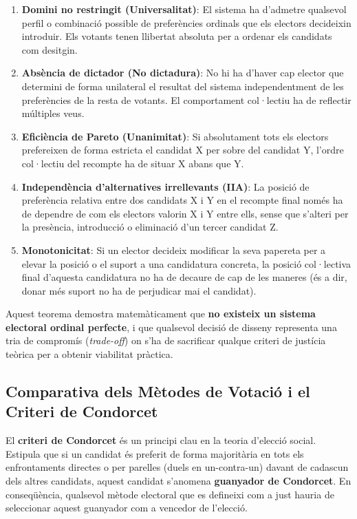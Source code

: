 \begin{enumerate}
    \item \textbf{Domini no restringit (Universalitat)}: El sistema ha d'admetre qualsevol perfil o combinació possible
    de preferències ordinals que els electors decideixin introduir.
    Els votants tenen llibertat absoluta per a ordenar els candidats com desitgin.

    \item \textbf{Absència de dictador (No dictadura)}: No hi ha d'haver cap elector que determini de forma unilateral
    el resultat del sistema independentment de les preferències de la resta de votants.
    El comportament col·lectiu ha de reflectir múltiples veus.

    \item \textbf{Eficiència de Pareto (Unanimitat)}: Si absolutament tots els electors prefereixen de forma estricta el
    candidat X per sobre del candidat Y, l'ordre col·lectiu del recompte ha de situar X abans que Y\@.

    \item \textbf{Independència d'alternatives irrellevants (IIA)}: La posició de preferència relativa entre dos
    candidats X i Y en el recompte final només ha de dependre de com els electors valorin X i Y entre ells, sense que
    s'alteri per la presència, introducció o eliminació d'un tercer candidat Z\@.

    \item \textbf{Monotonicitat}: Si un elector decideix modificar la seva papereta per a elevar la posició o el suport
    a una candidatura concreta, la posició col·lectiva final d'aquesta candidatura no ha de decaure de cap de les
    maneres (és a dir, donar més suport no ha de perjudicar mai el candidat).
\end{enumerate}

Aquest teorema demostra matemàticament que \textbf{no existeix un sistema electoral ordinal perfecte}, i que qualsevol
decisió de disseny representa una tria de compromís (\textit{trade-off}) on s'ha de sacrificar qualque criteri de
justícia teòrica per a obtenir viabilitat pràctica.

\subsection{Comparativa dels Mètodes de Votació i el Criteri de Condorcet}
\label{subsec:comparativa-metodes}

El \textbf{criteri de Condorcet} és un principi clau en la teoria d'elecció social.
Estipula que si un candidat és preferit de forma majoritària en tots els enfrontaments directes o per parelles (duels en
un-contra-un) davant de cadascun dels altres candidats, aquest candidat s'anomena \textbf{guanyador de Condorcet}.
En conseqüència, qualsevol mètode electoral que es defineixi com a just hauria de seleccionar aquest guanyador com a
vencedor de l'elecció.

